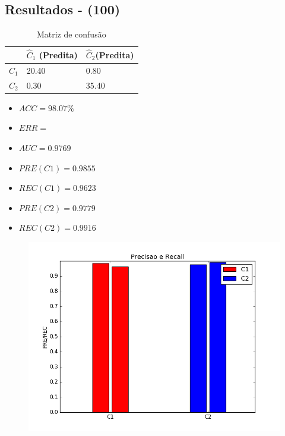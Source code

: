 \documentclass[11pt,a4paper]{article}
\numberwithin{equation}{section}
\begin{document}
\subsection{Resultados - (100)}

\begin{table}[H]
\centering
\caption{Matriz de confusão}
\begin{tabular}{l l l}
\hline
 & \textbf{$\hat{C}_1$ (Predita)} & \textbf{$\hat{C}_2$(Predita)}\\
\hline
$C_1$ & 20.40 & 0.80 \\
$C_2$ & 0.30  & 35.40\\ 
\hline
\end{tabular}
\end{table}

\begin{minipage}{.5\textwidth}
\begin{itemize}
\item $ACC = 98.07 \%$
\item $ERR =  $
\item $AUC = 0.9769  $
\item $PRE(C1) = 0.9855$
\item $REC(C1) = 0.9623$
\item $PRE(C2) = 0.9779$
\item $REC(C2) = 0.9916$
\end{itemize}
\end{minipage}%
\begin{minipage}{.5\textwidth}
\begin{figure}[H]
\centering
  \includegraphics[width=\linewidth]{../img/mlp_100.png}
  \label{fig:percep}
\end{figure}
\end{minipage}%
\end{document}
